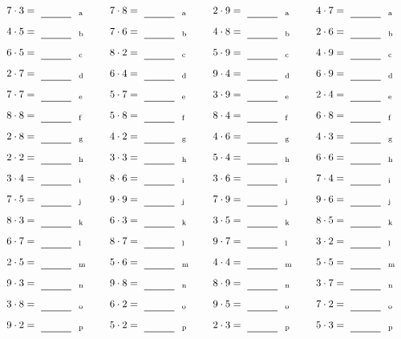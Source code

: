 \documentclass
[
  draft    = true,
  fontsize = 11pt,
  parskip  = half-
]
{scrartcl}
\begin{document}
\par\vfill\par
\begin{align*}
    \pline{7\cdot3}&=\rline{a}
  & \pline{7\cdot8}&=\rline{a}
  & \pline{2\cdot9}&=\rline{a}
  & \pline{4\cdot7}&=\rline{a} \\[1ex]
    \pline{4\cdot5}&=\rline{b}
  & \pline{7\cdot6}&=\rline{b}
  & \pline{4\cdot8}&=\rline{b}
  & \pline{2\cdot6}&=\rline{b} \\[1ex]
    \pline{6\cdot5}&=\rline{c}
  & \pline{8\cdot2}&=\rline{c}
  & \pline{5\cdot9}&=\rline{c}
  & \pline{4\cdot9}&=\rline{c} \\[1ex]
    \pline{2\cdot7}&=\rline{d}
  & \pline{6\cdot4}&=\rline{d}
  & \pline{9\cdot4}&=\rline{d}
  & \pline{6\cdot9}&=\rline{d} \\[1ex]
    \pline{7\cdot7}&=\rline{e}
  & \pline{5\cdot7}&=\rline{e}
  & \pline{3\cdot9}&=\rline{e}
  & \pline{2\cdot4}&=\rline{e} \\[1ex]
    \pline{8\cdot8}&=\rline{f}
  & \pline{5\cdot8}&=\rline{f}
  & \pline{8\cdot4}&=\rline{f}
  & \pline{6\cdot8}&=\rline{f} \\[1ex]
    \pline{2\cdot8}&=\rline{g}
  & \pline{4\cdot2}&=\rline{g}
  & \pline{4\cdot6}&=\rline{g}
  & \pline{4\cdot3}&=\rline{g} \\[1ex]
    \pline{2\cdot2}&=\rline{h}
  & \pline{3\cdot3}&=\rline{h}
  & \pline{5\cdot4}&=\rline{h}
  & \pline{6\cdot6}&=\rline{h} \\[1ex]
    \pline{3\cdot4}&=\rline{i}
  & \pline{8\cdot6}&=\rline{i}
  & \pline{3\cdot6}&=\rline{i}
  & \pline{7\cdot4}&=\rline{i} \\[1ex]
    \pline{7\cdot5}&=\rline{j}
  & \pline{9\cdot9}&=\rline{j}
  & \pline{7\cdot9}&=\rline{j}
  & \pline{9\cdot6}&=\rline{j} \\[1ex]
    \pline{8\cdot3}&=\rline{k}
  & \pline{6\cdot3}&=\rline{k}
  & \pline{3\cdot5}&=\rline{k}
  & \pline{8\cdot5}&=\rline{k} \\[1ex]
    \pline{6\cdot7}&=\rline{l}
  & \pline{8\cdot7}&=\rline{l}
  & \pline{9\cdot7}&=\rline{l}
  & \pline{3\cdot2}&=\rline{l} \\[1ex]
    \pline{2\cdot5}&=\rline{m}
  & \pline{5\cdot6}&=\rline{m}
  & \pline{4\cdot4}&=\rline{m}
  & \pline{5\cdot5}&=\rline{m} \\[1ex]
    \pline{9\cdot3}&=\rline{n}
  & \pline{9\cdot8}&=\rline{n}
  & \pline{8\cdot9}&=\rline{n}
  & \pline{3\cdot7}&=\rline{n} \\[1ex]
    \pline{3\cdot8}&=\rline{o}
  & \pline{6\cdot2}&=\rline{o}
  & \pline{9\cdot5}&=\rline{o}
  & \pline{7\cdot2}&=\rline{o} \\[1ex]
    \pline{9\cdot2}&=\rline{p}
  & \pline{5\cdot2}&=\rline{p}
  & \pline{2\cdot3}&=\rline{p}
  & \pline{5\cdot3}&=\rline{p}
\end{align*}
\end{document}
